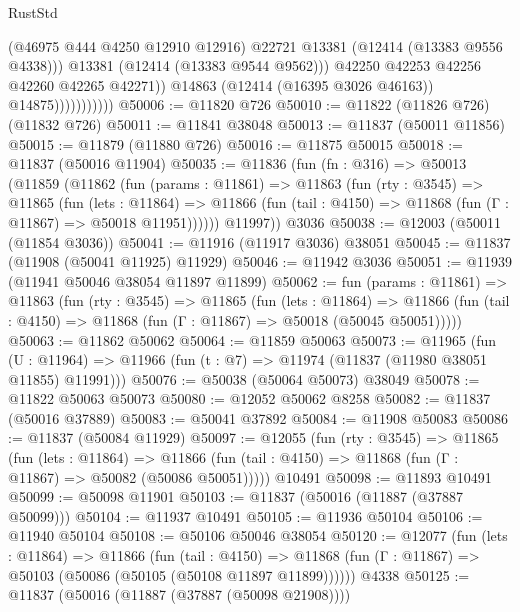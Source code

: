 \begin{lexlean}{RustStd}
\begin{coremodule}
{\begin{coremodule}
{{{{{{{{{{{{{{{{{{{{{{{{{{{{{{{{{{{{{{{{{{{{{{{{{{                                  (@46975 @444 @4250 @12910 @12916)
                                  @22721
                                  @13381
                                  (@12414 (@13383 @9556 @4338)))
                                @13381
                                (@12414 (@13383 @9544 @9562)))
                              @42250
                              @42253
                              @42256
                              @42260
                              @42265
                              @42271))
                          @14863
                          (@12414 (@16395 @3026 @46163))
                          @14875)))))))))))
@50006 := @11820 @726
@50010 := @11822 (@11826 @726) (@11832 @726)
@50011 := @11841 @38048
@50013 := @11837 (@50011 @11856)
@50015 := @11879 (@11880 @726)
@50016 := @11875 @50015
@50018 := @11837 (@50016 @11904)
@50035 := @11836
    (fun (fn : @316) =>
    @50013
      (@11859
        (@11862
          (fun (params : @11861) =>
          @11863
            (fun (rty : @3545) =>
            @11865
              (fun (lets : @11864) =>
              @11866 (fun (tail : @4150) => @11868 (fun (Γ : @11867) => @50018 @11951))))))
        @11997))
    @3036
@50038 := @12003 (@50011 (@11854 @3036))
@50041 := @11916 (@11917 @3036) @38051
@50045 := @11837 (@11908 (@50041 @11925) @11929)
@50046 := @11942 @3036
@50051 := @11939 (@11941 @50046 @38054 @11897 @11899)
@50062 := fun (params : @11861) =>
  @11863
    (fun (rty : @3545) =>
    @11865
      (fun (lets : @11864) =>
      @11866 (fun (tail : @4150) => @11868 (fun (Γ : @11867) => @50018 (@50045 @50051)))))
@50063 := @11862 @50062
@50064 := @11859 @50063
@50073 := @11965
    (fun (U : @11964) => @11966 (fun (t : @7) => @11974 (@11837 (@11980 @38051 @11855) @11991)))
@50076 := @50038 (@50064 @50073) @38049
@50078 := @11822 @50063 @50073
@50080 := @12052 @50062 @8258
@50082 := @11837 (@50016 @37889)
@50083 := @50041 @37892
@50084 := @11908 @50083
@50086 := @11837 (@50084 @11929)
@50097 := @12055
    (fun (rty : @3545) =>
    @11865
      (fun (lets : @11864) =>
      @11866 (fun (tail : @4150) => @11868 (fun (Γ : @11867) => @50082 (@50086 @50051)))))
    @10491
@50098 := @11893 @10491
@50099 := @50098 @11901
@50103 := @11837 (@50016 (@11887 (@37887 @50099)))
@50104 := @11937 @10491
@50105 := @11936 @50104
@50106 := @11940 @50104
@50108 := @50106 @50046 @38054
@50120 := @12077
    (fun (lets : @11864) =>
    @11866
      (fun (tail : @4150) =>
      @11868 (fun (Γ : @11867) => @50103 (@50086 (@50105 (@50108 @11897 @11899))))))
    @4338
@50125 := @11837 (@50016 (@11887 (@37887 (@50098 @21908))))
}}}}}}}}}}}}}}}}}}}}}}}}}}}}}}}}}}}}}}}}}}}}}}}}}}
\end{coremodule}}
\end{coremodule}
\end{lexlean}
